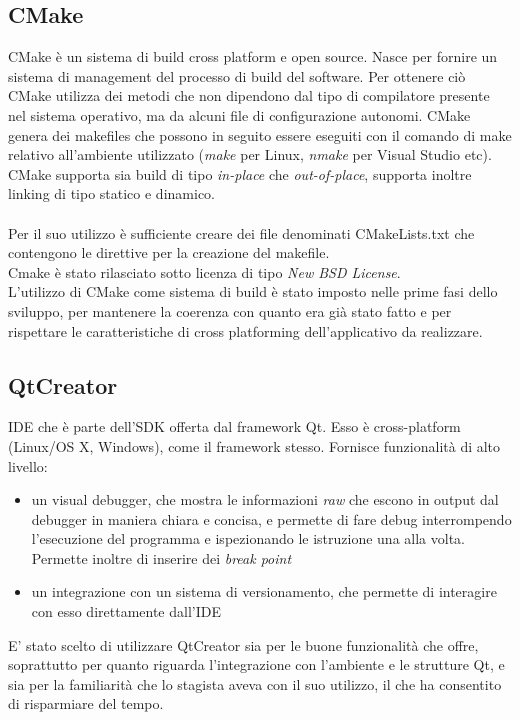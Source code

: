 {\subsection{CMake}
CMake è un sistema di build cross platform e open source. Nasce per fornire un sistema di management del processo di build del software. Per ottenere ciò CMake utilizza dei metodi che non dipendono dal tipo di compilatore presente nel sistema operativo, ma da alcuni file di configurazione autonomi. CMake genera dei makefiles che possono in seguito essere eseguiti con il comando di make relativo all'ambiente utilizzato (\textit{make} per Linux, \textit{nmake} per Visual Studio etc). CMake supporta sia build di tipo \textit{in-place} che \textit{out-of-place}, supporta inoltre linking di tipo statico e dinamico. \\ \\
Per il suo utilizzo è sufficiente creare dei file denominati CMakeLists.txt che contengono le direttive per la creazione del makefile. \\
Cmake è stato rilasciato sotto licenza di tipo \textit{New BSD License}.\\
L'utilizzo di CMake come sistema di build è stato imposto nelle prime fasi dello sviluppo, per mantenere la coerenza con quanto era già stato fatto e per rispettare le caratteristiche di cross platforming dell'applicativo da realizzare.


\subsection{QtCreator}
IDE che è parte dell'SDK offerta dal framework Qt. Esso è cross-platform (Linux/OS X, Windows), come il framework stesso. Fornisce funzionalità di alto livello:
\begin{itemize}
	\item un visual debugger, che mostra le informazioni \textit{raw} che escono in output dal debugger in maniera chiara e concisa, e permette di fare debug interrompendo l'esecuzione del programma e ispezionando le istruzione una alla volta. Permette inoltre di inserire dei \textit{break point}
	\item un integrazione con un sistema di versionamento, che permette di interagire con esso direttamente dall'IDE
	\end{itemize}
E' stato scelto di utilizzare QtCreator sia per le buone funzionalità che offre, soprattutto per quanto riguarda l'integrazione con l'ambiente e le strutture Qt, e sia per la familiarità che lo stagista aveva con il suo utilizzo, il che ha consentito di risparmiare del tempo.

}
